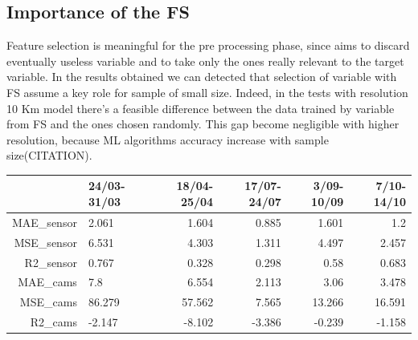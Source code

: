 \subsection{Importance of the FS}
Feature selection is meaningful for the pre processing phase, since aims to discard eventually useless variable and to take only the ones really relevant to the target variable. In the results obtained we can detected that selection of variable with FS assume a key role for sample of small size. 
Indeed, in the tests with resolution 10 Km model there's a feasible difference between the data trained by variable from FS and the ones chosen randomly. 
This gap become negligible with higher resolution, because ML algorithms accuracy increase with sample size(CITATION).
\begin{tabular}{rlrrrr}
\hline
          &   24/03-31/03 &   18/04-25/04 &   17/07-24/07 &   3/09-10/09 &   7/10-14/10 \\
\hline
   MAE\_sensor &         2.061 &         1.604 &         0.885 &        1.601 &        1.2   \\
    MSE\_sensor &         6.531 &         4.303 &         1.311 &        4.497 &        2.457 \\
    R2\_sensor  &         0.767 &         0.328 &         0.298 &        0.58  &        0.683 \\
    MAE\_cams   &         7.8   &         6.554 &         2.113 &        3.06  &        3.478 \\
    MSE\_cams   &        86.279 &        57.562 &         7.565 &       13.266 &       16.591 \\
    R2\_cams    &        -2.147 &        -8.102 &        -3.386 &       -0.239 &       -1.158 \\
\hline
\end{tabular}

